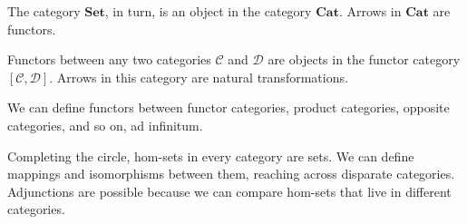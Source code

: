 \documentclass[DaoFP]{subfiles}
\begin{document}
The category $\mathbf{Set}$, in turn, is an object in the category $\mathbf{Cat}$. Arrows in $\mathbf{Cat}$ are functors. 

Functors between any two categories $\mathcal{C}$ and $\mathcal{D}$ are objects in the functor category $[\mathcal{C}, \mathcal{D}]$. Arrows in this category are natural transformations.

We can define functors between functor categories, product categories, opposite categories, and so on, ad infinitum. 

Completing the circle, hom-sets in every category are sets. We can define mappings and isomorphisms between them, reaching across disparate categories. Adjunctions are possible because we can compare hom-sets that live in different categories.
\end{document}
